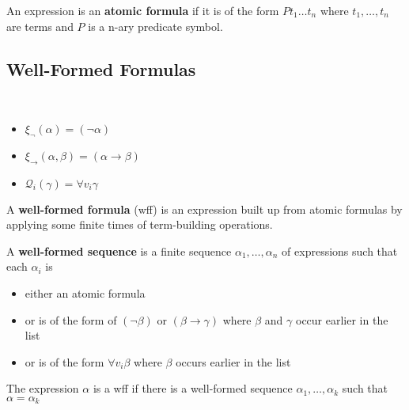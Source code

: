 \begin{definition}
    \label{def:AtomicFormula}
    An expression is an \textbf{atomic formula} if it is of the form $P t_1\dots t_n$ where $t_1,\dots,t_n$ are terms and $P$ is a n-ary predicate symbol.
\end{definition}

\subsection{Well-Formed Formulas}

\begin{definition}~{}
    \label{def:FormulaBuildingOperation}
    \begin{itemize}
        \item $\xi_\neg(\alpha) = (\neg \alpha)$
        \item $\xi_\to(\alpha, \beta) = (\alpha\to\beta)$
        \item $\mathcal{Q}_i(\gamma) = \forall v_i\gamma$
    \end{itemize}
\end{definition}

\begin{definition}
    A \textbf{well-formed formula} (wff) is an expression built up from atomic formulas by applying some finite times of term-building operations.
\end{definition}

\begin{definition}
    A \textbf{well-formed sequence} is a finite sequence $\alpha_1,\dots,\alpha_n$ of expressions such that each $\alpha_i$ is
    \begin{itemize}
        \item either an atomic formula
        \item or is of the form of $(\neg \beta)$ or $(\beta\to\gamma)$ where $\beta$ and $\gamma$ occur earlier in the list
        \item or is of the form $\forall v_i\beta$ where $\beta$ occurs earlier in the list
    \end{itemize}
\end{definition}

\begin{proposition}
    The expression $\alpha$ is a wff if there is a well-formed sequence $\alpha_1,\dots,\alpha_k$ such that $\alpha = \alpha_k$
\end{proposition}

